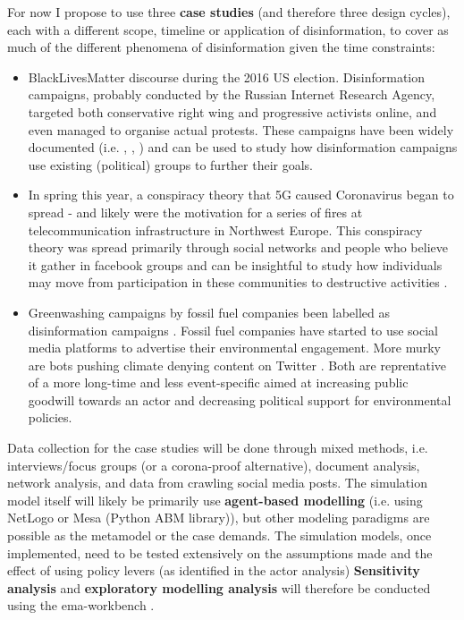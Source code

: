 For now I propose to use three \textbf{case studies} (and therefore three design cycles), each with a different scope, timeline or application of disinformation, to cover as much of the different phenomena of disinformation given the time constraints:
\begin{itemize}
	\item BlackLivesMatter discourse during the 2016 US election. Disinformation campaigns, probably conducted by the Russian Internet Research Agency, targeted both conservative right wing and progressive activists online, and even managed to organise actual protests. These campaigns have been widely documented (i.e. \cite{Frenkel2018}, \cite{Arif2018}, \cite{SCI2019}) and can be used to study how disinformation campaigns use existing (political) groups to further their goals. 
	\item In spring this year, a conspiracy theory that 5G caused Coronavirus began to spread - and likely were the motivation for a series of fires at telecommunication infrastructure in Northwest Europe. This conspiracy theory was spread primarily through social networks and people who believe it gather in facebook groups \citep{Heck2020, Ahmed2020} and can be insightful to study how individuals may move from participation in these communities to destructive activities \citep{Jolley2020}.
	\item Greenwashing campaigns by fossil fuel companies been labelled as disinformation campaigns \citep{Kolmes2011, Mulvey2015, Schmuck2018}. Fossil fuel companies have started to use social media platforms to advertise their environmental engagement. More murky are bots pushing climate denying content on Twitter \citep{Marlow2020}. Both are reprentative of a more long-time and less event-specific aimed at increasing public goodwill towards an actor and decreasing political support for environmental policies.
\end{itemize}

Data collection for the case studies will be done through mixed methods, i.e. interviews/focus groups (or a corona-proof alternative), document analysis, network analysis, and data from crawling social media posts. The simulation model itself will likely be primarily use \textbf{agent-based modelling} (i.e. using NetLogo or Mesa (Python ABM library)), but other modeling paradigms are possible as the metamodel or the case demands. The simulation models, once implemented, need to be tested extensively on the assumptions made and the effect of using policy levers (as identified in the actor analysis) \textbf{Sensitivity analysis} and \textbf{exploratory modelling analysis} will therefore be conducted using the ema-workbench \citep{Kwakkel2017}.



